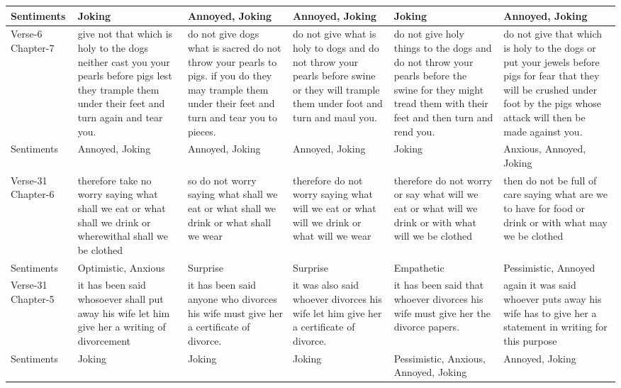 \documentclass[5p,times]{elsarticle}
\begin{document}
\begin{table}[htbp!]
\begin{center}
\begin{tabular}{p{}p{}p{}p{}p{}p{}}
\\  \hline
Sentiments&Joking&Annoyed, Joking&Annoyed, Joking&Joking&Annoyed, Joking\\  \hline
Verse-6 Chapter-7&give not that which is holy to the dogs neither cast you your pearls before pigs lest they trample them under their feet and turn again and tear you.&do not give dogs what is sacred do not throw your pearls to pigs. if you do they may trample them under their feet and turn and tear you to pieces.&do not give what is holy to dogs and do not throw your pearls before swine or they will trample them under foot and turn and maul you.&do not give holy things to the dogs and do not throw your pearls before the swine for they might tread them with their feet and then turn and rend you.&do not give that which is holy to the dogs or put your jewels before pigs for fear that they will be crushed under foot by the pigs whose attack will then be made against you.\\\hline
Sentiments&Annoyed, Joking&Annoyed, Joking&Annoyed, Joking&Joking&Anxious, Annoyed, Joking\\\hline
Verse-31 Chapter-6 &therefore take no worry saying what shall we eat or what shall we drink or wherewithal shall we be clothed&so do not worry saying what shall we eat or what shall we drink or what shall we wear&therefore do not worry saying what will we eat or what will we drink or what will we wear&therefore do not worry or say what will we eat or what will we drink or with what will we be clothed&then do not be full of care saying what are we to have for food or drink or with what may we be clothed\\\hline
Sentiments&Optimistic, Anxious&Surprise&Surprise&Empathetic&Pessimistic, Annoyed\\\hline
Verse-31 Chapter-5&it has been said whosoever shall put away his wife let him give her a writing of divorcement&it has been said anyone who divorces his wife must give her a certificate of divorce.&it was also said whoever divorces his wife let him give her a certificate of divorce.&it has been said that whoever divorces his wife must give her the divorce papers.&again it was said whoever puts away his wife has to give her a statement in writing for this purpose\\\hline
Sentiments&Joking&Joking&Joking&Pessimistic, Anxious, Annoyed, Joking&Annoyed, Joking\\\hline

\end{tabular}
\end{center}
\end{table}
\end{document}
